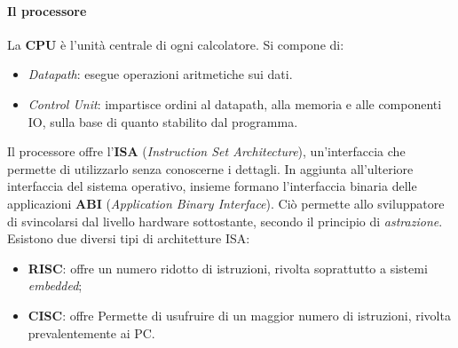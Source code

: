 \paragraph*{Il processore}
La \textbf{CPU} è l'unità centrale di ogni calcolatore. Si compone di:
\begin{itemize}[noitemsep]
	\item \textit{Datapath}: esegue operazioni aritmetiche sui dati.
	\item \textit{Control Unit}: impartisce ordini al datapath, alla memoria e alle componenti IO, sulla base di quanto stabilito dal programma.
\end{itemize}
Il processore offre l'\textbf{ISA} (\textit{Instruction Set Architecture}), un'interfaccia che permette di utilizzarlo senza conoscerne i dettagli. In aggiunta all'ulteriore interfaccia del sistema operativo, insieme formano l'interfaccia binaria delle applicazioni \textbf{ABI} (\textit{Application Binary Interface}). Ciò permette allo sviluppatore di svincolarsi dal livello hardware sottostante, secondo il principio di \textit{astrazione}.\\ Esistono due diversi tipi di architetture ISA:
\begin{itemize}[noitemsep,nolistsep]
	\item \textbf{RISC}: offre un numero ridotto di istruzioni, rivolta soprattutto a sistemi \textit{embedded};
	\item \textbf{CISC}: offre Permette di usufruire di un maggior numero di istruzioni, rivolta prevalentemente ai PC.
\end{itemize}

